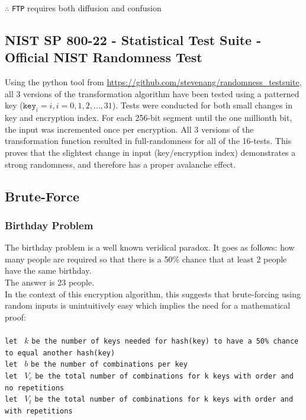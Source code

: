 \documentclass[11pt]{article}
\theoremstyle{definition}
\theoremstyle{remark}
\begin{document}
$\therefore$ \texttt{FTP} requires both diffusion and confusion

\subsection {NIST SP 800-22 - Statistical Test Suite - Official NIST Randomness Test}

Using the python tool from \href{https://github.com/stevenang/randomness\_testsuite}{https://github.com/stevenang/randomness\_testsuite}, all 3 versions of the transformation algorithm have been tested using a patterned key ($\texttt{key}_i=i, i=0,1,2,\dots,31$). Tests were conducted for both small changes in key and encryption index. For each 256-bit segment until the one millionth bit, the input was incremented once per encryption. All 3 versions of the transformation function resulted in full-randomness for all of the 16-tests. This proves that the slightest change in input (key/encryption index) demonstrates a strong randomness, and therefore has a proper avalanche effect.

\subsection{Brute-Force}

\subsubsection {Birthday Problem} \label{birthday_problem}

The birthday problem is a well known veridical paradox. It goes as follows: how many people are required so that there is a 50\% chance that at least 2 people have the same birthday.
\\
The answer is 23 people.
\\
In the context of this encryption algorithm, this suggests that brute-forcing using random inputs is unintuitively easy which implies the need for a mathematical proof:
\\
\\
\texttt{let } $k$ \texttt{be the number of keys needed for hash(key) to have a 50\% chance to equal another hash(key)} \\
\texttt{let } $b$ \texttt{be the number of combinations per key} \\
\texttt{let } $V_c$ \texttt{be the total number of combinations for k keys with order and no repetitions} \\
\texttt{let } $V_t$ \texttt{be the total number of combinations for k keys with order and with repetitions} \\
\end{document}

